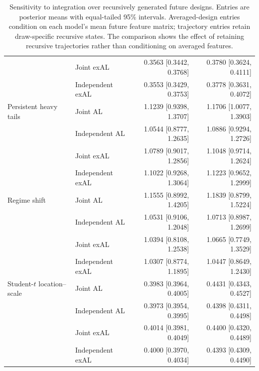 \begin{table}[p]
{\begin{tabular}{@{}>{\raggedright\arraybackslash}p{}>{\raggedright\arraybackslash}p{}rr@{}}
 & Joint exAL & 0.3563 [0.3442, 0.3768] & 0.3780 [0.3624, 0.4111] \\
 & Independent exAL & 0.3553 [0.3429, 0.3753] & 0.3778 [0.3631, 0.4072] \\
\addlinespace[2pt]
Persistent heavy tails & Joint AL & 1.1239 [0.9398, 1.3707] & 1.1706 [1.0077, 1.3903] \\
 & Independent AL & 1.0544 [0.8777, 1.2635] & 1.0886 [0.9294, 1.2726] \\
 & Joint exAL & 1.0789 [0.9017, 1.2856] & 1.1048 [0.9714, 1.2624] \\
 & Independent exAL & 1.1022 [0.9268, 1.3064] & 1.1223 [0.9652, 1.2999] \\
\addlinespace[2pt]
Regime shift & Joint AL & 1.1555 [0.8992, 1.4205] & 1.1839 [0.8799, 1.5224] \\
 & Independent AL & 1.0531 [0.9106, 1.2048] & 1.0713 [0.8987, 1.2699] \\
 & Joint exAL & 1.0394 [0.8108, 1.2538] & 1.0665 [0.7749, 1.3529] \\
 & Independent exAL & 1.0307 [0.8774, 1.1895] & 1.0447 [0.8649, 1.2430] \\
\addlinespace[2pt]
Student-\(t\) location--scale & Joint AL & 0.3983 [0.3964, 0.4005] & 0.4431 [0.4343, 0.4527] \\
 & Independent AL & 0.3973 [0.3954, 0.3995] & 0.4398 [0.4311, 0.4498] \\
 & Joint exAL & 0.4014 [0.3981, 0.4049] & 0.4400 [0.4320, 0.4489] \\
 & Independent exAL & 0.4000 [0.3970, 0.4034] & 0.4393 [0.4309, 0.4490] \\
\bottomrule
\end{tabular}
}%
\caption{Sensitivity to integration over recursively generated future designs. Entries are posterior means with equal-tailed 95\% intervals. Averaged-design entries condition on each model's mean future feature matrix; trajectory entries retain draw-specific recursive states. The comparison shows the effect of retaining recursive trajectories rather than conditioning on averaged features.}
\label{tab:joint-qdesn-pure-desn-v1-recursive-policy}
\end{table}
